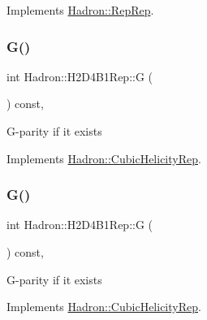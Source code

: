 Implements \mbox{\hyperlink{structHadron_1_1RepRep_a92c8802e5ed7afd7da43ccfd5b7cd92b}{Hadron\+::\+Rep\+Rep}}.

\mbox{\label{structHadron_1_1H2D4B1Rep_a327c671d4dca8693f717827d478e03aa}} 
\subsubsection{\texorpdfstring{G()}{G()}\hspace{0.1cm}{\footnotesize\ttfamily [1/3]}}
{\footnotesize\ttfamily int Hadron\+::\+H2\+D4\+B1\+Rep\+::G (\begin{DoxyParamCaption}{ }\end{DoxyParamCaption}) const\hspace{0.3cm}{\ttfamily [inline]}, {\ttfamily [virtual]}}

G-\/parity if it exists 

Implements \mbox{\hyperlink{structHadron_1_1CubicHelicityRep_a50689f42be1e6170aa8cf6ad0597018b}{Hadron\+::\+Cubic\+Helicity\+Rep}}.

\mbox{\label{structHadron_1_1H2D4B1Rep_a327c671d4dca8693f717827d478e03aa}} 
\subsubsection{\texorpdfstring{G()}{G()}\hspace{0.1cm}{\footnotesize\ttfamily [2/3]}}
{\footnotesize\ttfamily int Hadron\+::\+H2\+D4\+B1\+Rep\+::G (\begin{DoxyParamCaption}{ }\end{DoxyParamCaption}) const\hspace{0.3cm}{\ttfamily [inline]}, {\ttfamily [virtual]}}

G-\/parity if it exists 

Implements \mbox{\hyperlink{structHadron_1_1CubicHelicityRep_a50689f42be1e6170aa8cf6ad0597018b}{Hadron\+::\+Cubic\+Helicity\+Rep}}.

\mbox{\label{structHadron_1_1H2D4B1Rep_a327c671d4dca8693f717827d478e03aa}} 
